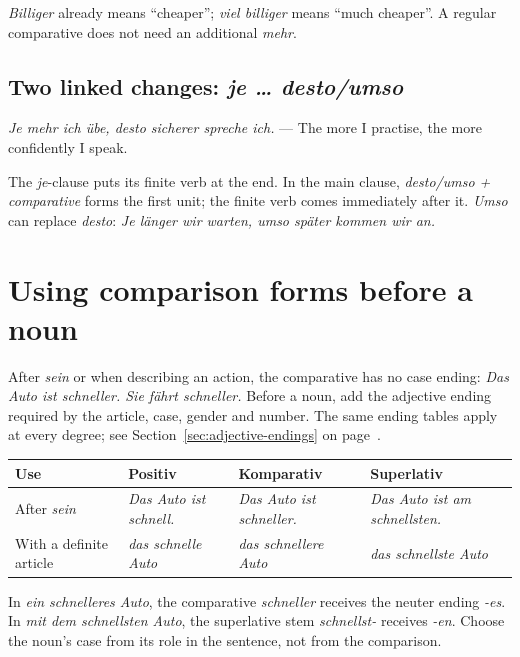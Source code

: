 \textit{Billiger} already means ``cheaper''; \textit{viel billiger} means
``much cheaper''. A regular comparative does not need an additional
\textit{mehr}.

\subsection{Two linked changes: \textit{je \ldots{} desto/umso}}

\textit{Je mehr ich übe, desto sicherer spreche ich.}
\quad--- The more I practise, the more confidently I speak.

The \textit{je}-clause puts its finite verb at the end. In the main clause,
\textit{desto/umso + comparative} forms the first unit; the finite verb
comes immediately after it. \textit{Umso} can replace \textit{desto}:
\textit{Je länger wir warten, umso später kommen wir an.}

\section{Using comparison forms before a noun}

After \textit{sein} or when describing an action, the comparative has no
case ending: \textit{Das Auto ist schneller. Sie fährt schneller.}
Before a noun, add the adjective ending required by the article, case,
gender and number. The same ending tables apply at every degree; see
Section~\ref{sec:adjective-endings} on page~\pageref{sec:adjective-endings}.

\begin{center}
\small
{}
\begin{tabularx}{\textwidth}{@{}lXXX@{}}
\toprule
Use & Positiv & Komparativ & Superlativ \\
\midrule
After \textit{sein} & \textit{Das Auto ist schnell.}
  & \textit{Das Auto ist schneller.}
  & \textit{Das Auto ist am schnellsten.} \\
With a definite article & \textit{das schnelle Auto}
  & \textit{das schnellere Auto}
  & \textit{das schnellste Auto} \\
\bottomrule
\end{tabularx}
\end{center}

In \textit{ein schnelleres Auto}, the comparative \textit{schneller}
receives the neuter ending \textit{-es}. In \textit{mit dem schnellsten Auto},
the superlative stem \textit{schnellst-} receives \textit{-en}.
Choose the noun's case from its role in the sentence, not from the comparison.

